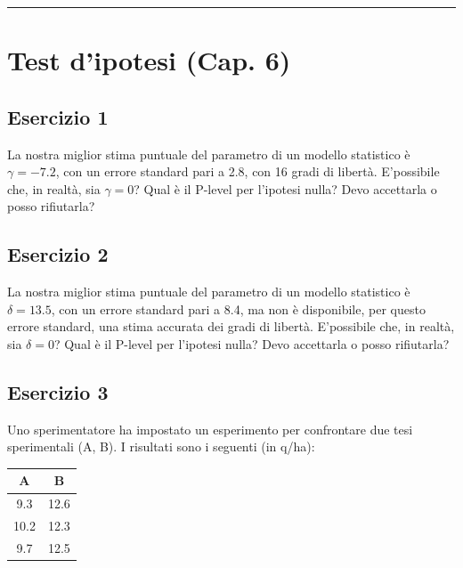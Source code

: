 \documentclass[a4paper,12pt,oneside]{book}
\begin{document}
\begin{center}\rule{0.5\linewidth}{0.5pt}\end{center}

\hypertarget{test-dipotesi-cap.-6}{%
\section{Test d'ipotesi (Cap. 6)}\label{test-dipotesi-cap.-6}}

\hypertarget{esercizio-1-4}{%
\subsection{Esercizio 1}\label{esercizio-1-4}}

La nostra miglior stima puntuale del parametro di un modello statistico è \(\gamma = -7.2\), con un errore standard pari a 2.8, con 16 gradi di libertà. E'possibile che, in realtà, sia \(\gamma = 0\)? Qual è il P-level per l'ipotesi nulla? Devo accettarla o posso rifiutarla?

\hypertarget{esercizio-2-4}{%
\subsection{Esercizio 2}\label{esercizio-2-4}}

La nostra miglior stima puntuale del parametro di un modello statistico è \(\delta = 13.5\), con un errore standard pari a 8.4, ma non è disponibile, per questo errore standard, una stima accurata dei gradi di libertà. E'possibile che, in realtà, sia \(\delta = 0\)? Qual è il P-level per l'ipotesi nulla? Devo accettarla o posso rifiutarla?

\hypertarget{esercizio-3-4}{%
\subsection{Esercizio 3}\label{esercizio-3-4}}

Uno sperimentatore ha impostato un esperimento per confrontare due tesi sperimentali (A, B). I risultati sono i seguenti (in q/ha):

\begin{longtable}[]{@{}cc@{}}
\toprule()
A & B \\
\midrule()
\endhead
9.3 & 12.6 \\
10.2 & 12.3 \\
9.7 & 12.5 \\
\bottomrule()
\end{longtable}
\end{document}
